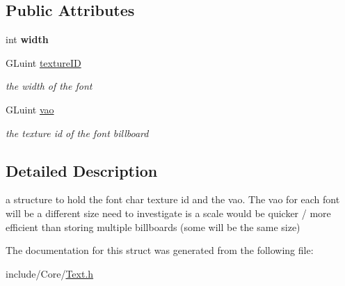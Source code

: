 \subsection*{Public Attributes}
\begin{DoxyCompactItemize}
\item 
\hypertarget{struct_text_1_1_font_char_abbf7e80a16c3190894c5a9e195180bd8}{int {\bfseries width}}\label{struct_text_1_1_font_char_abbf7e80a16c3190894c5a9e195180bd8}

\item 
\hypertarget{struct_text_1_1_font_char_a7ef075790be18e9bac4bfbb56b528428}{G\-Luint \hyperlink{struct_text_1_1_font_char_a7ef075790be18e9bac4bfbb56b528428}{texture\-I\-D}}\label{struct_text_1_1_font_char_a7ef075790be18e9bac4bfbb56b528428}

\begin{DoxyCompactList}\small\item\em the width of the font \end{DoxyCompactList}\item 
\hypertarget{struct_text_1_1_font_char_a763c6e3ecbe30d33becd27b8c7310d39}{G\-Luint \hyperlink{struct_text_1_1_font_char_a763c6e3ecbe30d33becd27b8c7310d39}{vao}}\label{struct_text_1_1_font_char_a763c6e3ecbe30d33becd27b8c7310d39}

\begin{DoxyCompactList}\small\item\em the texture id of the font billboard \end{DoxyCompactList}\end{DoxyCompactItemize}


\subsection{Detailed Description}
a structure to hold the font char texture id and the vao. The vao for each font will be a different size need to investigate is a scale would be quicker / more efficient than storing multiple billboards (some will be the same size) 

The documentation for this struct was generated from the following file\-:\begin{DoxyCompactItemize}
\item 
include/\-Core/\hyperlink{_text_8h}{Text.\-h}\end{DoxyCompactItemize}
